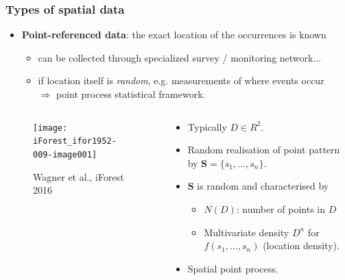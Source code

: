 \documentclass[slidestop,compress,serif,10pt]{beamer}
\begin{document}
\begin{frame}
    \frametitle{Types of spatial data}
\begin{itemize}
\vfill  \item \textbf{Point-referenced data}: the exact location of the occurrences is known
        \begin{itemize}
\vfill        \item can be collected through specialized survey / monitoring network...
\vfill        \item if location itself is \emph{random}, e.g. measurements of where events occur\\
         $\Rightarrow$ \alert{point process statistical framework.}
\end{itemize}
\end{itemize}

\begin{columns}
\begin{column}{0.4\textwidth}
\begin{figure}[!h]\texttt{[image: iForest\_ifor1952-009-image001]}\caption{Wagner et al., iForest 2016}\end{figure}
\end{column}
\begin{column}{0.6\textwidth}
\begin{itemize}
\item Typically $D \in R^2$.
\item Random realisation of point pattern by $\bm{S}=\{s_1, \ldots, s_n\}$.
\item $\bm{S}$ is random and characterised by
\begin{itemize}
\item $N(D)$: number of points in $D$
\item Multivariate density $D^n$ for $f(s_1,\ldots,s_n)$ (location density).
\end{itemize}
\item Spatial point process. 
\end{itemize}
\end{column}
\end{columns}
\end{frame}
\end{document}
